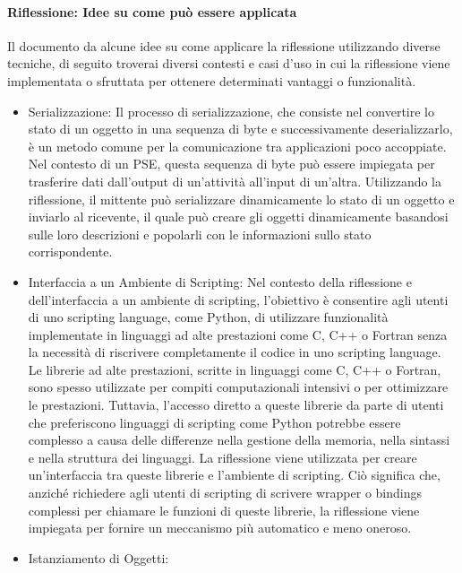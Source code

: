 \documentclass[11pt]{article}
\begin{document}
\begin{multicols*}{2}[\columnsep=1cm]
\begin{itemize}
    \end{itemize}

    \paragraph{Riflessione: Idee su come può essere applicata}
    Il documento da alcune idee su come applicare la riflessione utilizzando diverse tecniche, di seguito troverai diversi contesti e casi d'uso in cui la riflessione viene implementata o sfruttata per ottenere determinati vantaggi o funzionalità.
    \begin{itemize}
    \item {Serializzazione:}
    Il processo di serializzazione, che consiste nel convertire lo stato di un oggetto in una sequenza di byte e successivamente deserializzarlo, è un metodo comune per la comunicazione tra applicazioni poco accoppiate. 
    Nel contesto di un PSE, questa sequenza di byte può essere impiegata per trasferire dati dall'output di un'attività all'input di un'altra. 
    Utilizzando la riflessione, il mittente può serializzare dinamicamente lo stato di un oggetto e inviarlo al ricevente, il quale può creare gli oggetti dinamicamente basandosi sulle loro descrizioni e popolarli con le informazioni sullo stato corrispondente. 
    \item {Interfaccia a un Ambiente di Scripting:}
    Nel contesto della riflessione e dell'interfaccia a un ambiente di scripting, l'obiettivo è consentire agli utenti di uno scripting language, come Python, di utilizzare funzionalità implementate in linguaggi ad alte prestazioni come C, C++ o Fortran senza la necessità di riscrivere completamente il codice in uno scripting language.
    Le librerie ad alte prestazioni, scritte in linguaggi come C, C++ o Fortran, sono spesso utilizzate per compiti computazionali intensivi o per ottimizzare le prestazioni. Tuttavia, l'accesso diretto a queste librerie da parte di utenti che preferiscono linguaggi di scripting come Python potrebbe essere complesso a causa delle differenze nella gestione della memoria, nella sintassi e nella struttura dei linguaggi.
    La riflessione viene utilizzata per creare un'interfaccia tra queste librerie e l'ambiente di scripting. Ciò significa che, anziché richiedere agli utenti di scripting di scrivere wrapper o bindings complessi per chiamare le funzioni di queste librerie, la riflessione viene impiegata per fornire un meccanismo più automatico e meno oneroso.    
    \item {Istanziamento di Oggetti:}

\end{itemize}
\end{multicols*}
\end{document}
